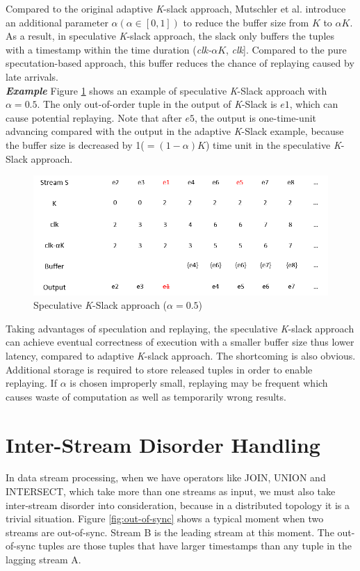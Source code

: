 \documentclass[a4paper, 11pt, twoside]{report}
\begin{document}
Compared to the original adaptive \textit{K}-slack approach, Mutschler et al. introduce an additional parameter $\alpha (\alpha\in[0,1])$ to reduce the buffer size from $K$ to $\alpha K$. As a result, in speculative \textit{K}-slack approach, the slack only buffers the tuples with a timestamp within the time duration (\textit{clk-$\alpha K$}, \textit{clk}]. Compared to the pure specutation-based approach, this buffer reduces the chance of replaying caused by late arrivals.\\

\noindent\textbf{\textit{Example}} Figure \ref{fig:speculative-k-slack-example} shows an example of speculative \textit{K}-Slack approach with $\alpha=0.5$. The only out-of-order tuple in the output of \textit{K}-Slack is $e1$, which can cause potential replaying. Note that after $e5$, the output is one-time-unit advancing compared with the output in the adaptive \textit{K}-Slack example, because the buffer size is decreased by 1($=(1-\alpha) K$) time unit in the speculative \textit{K}-Slack approach.\\

\begin{figure}[h]
\centering
\includegraphics[width=5in]{speculative-k-slack-example}
\caption{Speculative \textit{K}-Slack approach ($\alpha=0.5$)\label{fig:speculative-k-slack-example}}
\end{figure}

Taking advantages of speculation and replaying, the speculative \textit{K}-slack approach can achieve eventual correctness of execution with a smaller buffer size thus lower latency, compared to adaptive \textit{K}-slack approach. The shortcoming is also obvious. Additional storage is required to store released tuples in order to enable replaying. If $\alpha$ is chosen improperly small, replaying may be frequent which causes waste of computation as well as temporarily wrong results.\\

\section{Inter-Stream Disorder Handling}
\label{sec:inter-stream disorder handling}
In data stream processing, when we have operators like JOIN, UNION and INTERSECT, which take more than one streams as input, we must also take inter-stream disorder into consideration, because in a distributed topology it is a trivial situation. Figure \ref{fig:out-of-sync} shows a typical moment when two streams are out-of-sync. Stream B is the leading stream at this moment. The out-of-sync tuples are those tuples that have larger timestamps than any tuple in the lagging stream A.\\
\end{document}
